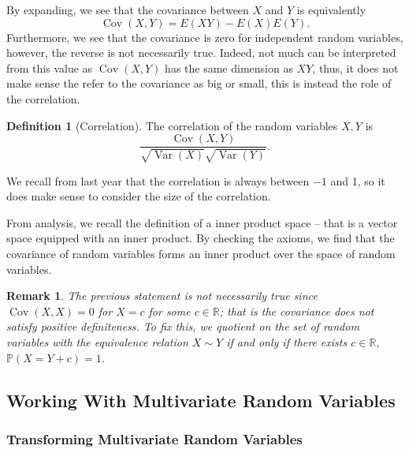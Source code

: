 \documentclass[
]{article}
\newtheorem*{remark}{Remark}
\theoremstyle{definition}
\newtheorem{definition}{Definition}[section]
\begin{document}
By expanding, we see that the covariance between \(X\) and \(Y\) is
equivalently \[\mathop{\mathrm{Cov}}(X, Y) = E(XY) - E(X)E(Y).\]
Furthermore, we see that the covariance is zero for independent random
variables, however, the reverse is not necessarily true. Indeed, not
much can be interpreted from this value as
\(\mathop{\mathrm{Cov}}(X, Y)\) has the same dimension as \(XY\), thus,
it does not make sense the refer to the covariance as big or small, this
is instead the role of the correlation.

\begin{definition}[Correlation]
  The correlation of the random variables \(X, Y\) is
  \[\frac{\mathop{\mathrm{Cov}}(X, Y)}{\sqrt{\mathop{\mathrm{Var}}(X)} \sqrt{\mathop{\mathrm{Var}}(Y)}}.\]
\end{definition}

We recall from last year that the correlation is always between \(-1\)
and 1, so it does make sense to consider the size of the correlation.

From analysis, we recall the definition of a inner product space -- that
is a vector space equipped with an inner product. By checking the
axioms, we find that the covariance of random variables forms an inner
product over the space of random variables.

\begin{remark}
  The previous statement is not necessarily true since \(\mathop{\mathrm{Cov}}(X, X) = 0\) for 
  \(X = c\) for some \(c \in \mathbb{R}\); that is the covariance does not 
  satisfy positive definiteness. To fix this, we quotient on the set of random 
  variables with the equivalence relation \(X \sim Y\) if and only if there exists 
  \(c \in \mathbb{R}\), \(\mathbb{P}(X = Y + c) = 1\).
\end{remark}

\hypertarget{working-with-multivariate-random-variables}{%
\subsection{Working With Multivariate Random
Variables}\label{working-with-multivariate-random-variables}}

\hypertarget{transforming-multivariate-random-variables}{%
\subsubsection{Transforming Multivariate Random
Variables}\label{transforming-multivariate-random-variables}}
\end{document}
